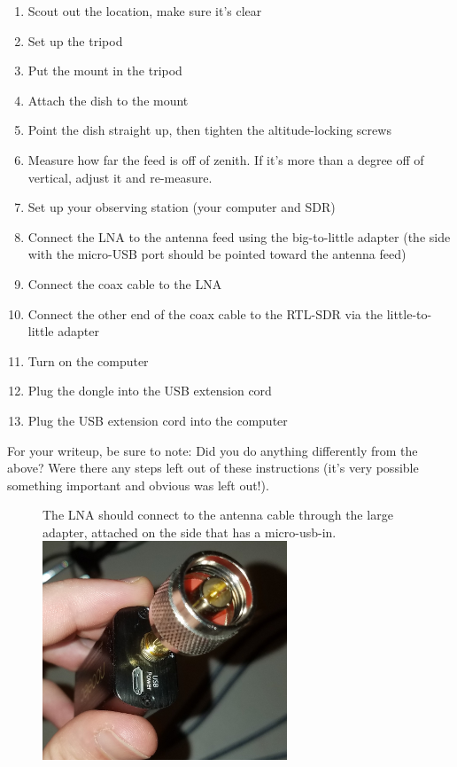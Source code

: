 \documentclass[11pt]{article}
\begin{document}
\begin{enumerate}
    \item Scout out the location, make sure it's clear
    \item Set up the tripod
    \item Put the mount in the tripod
    \item Attach the dish to the mount
    \item Point the dish straight up, then tighten the altitude-locking screws
    \item Measure how far the feed is off of zenith.  If it's more than a degree off of vertical, adjust it and re-measure.
    \item Set up your observing station (your computer and SDR)
    \item Connect the LNA to the antenna feed using the big-to-little adapter
        (the side with the micro-USB port should be pointed toward the antenna
        feed)
    \item Connect the coax cable to the LNA
    \item Connect the other end of the coax cable to the RTL-SDR via the little-to-little adapter
    \item Turn on the computer
    \item Plug the dongle into the USB extension cord
    \item Plug the USB extension cord into the computer
\end{enumerate}

For your writeup, be sure to note: Did you do anything differently from the above?
Were there any steps left out of these instructions (it's very possible something important
and obvious was left out!).


\begin{figure}[htp]
    \begin{minipage}{0.45\textwidth}
    \centering
        The LNA should connect to the antenna cable through the large adapter, attached on the side that has a micro-usb-in.\\
        \vspace{3mm}
    \includegraphics[width=0.65\textwidth]{RadioLabPhotos/coax_adapter_on_LNA.jpg}
    \end{minipage}
\end{figure}
\end{document}
